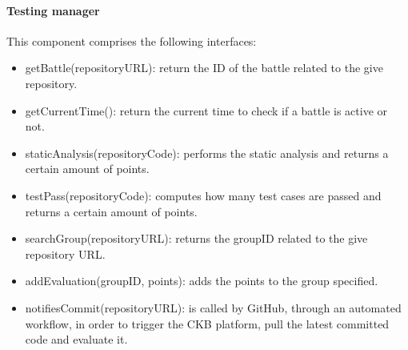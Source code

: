 \documentclass[12pt, a4paper]{report}
\begin{document}
    \paragraph*{Testing manager}
    This component comprises the following interfaces: 
    \begin{itemize}
        \item getBattle(repositoryURL): return the ID of the battle related to the give repository. 
        \item getCurrentTime(): return the current time to check if a battle is active or not. 
        \item staticAnalysis(repositoryCode): performs the static analysis and returns a certain amount of points. 
        \item testPass(repositoryCode): computes how many test cases are passed and returns a certain amount of points. 
        \item searchGroup(repositoryURL): returns the groupID related to the give repository URL. 
        \item addEvaluation(groupID, points): adds the points to the group specified. 
        \item notifiesCommit(repositoryURL): is called by GitHub, through an automated workflow, in order to trigger the CKB platform,
              pull the latest committed code and evaluate it. 
        \end{itemize}
\end{document}
